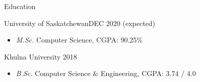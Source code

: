 \documentclass[]{mcdowellcv}
\begin{document}
	\makeheader
	
	
	
	\begin{cvsection}{Education}
		\begin{cvsubsection}{University of Saskatchewan}{}{DEC 2020 (expected)}
			\begin{itemize}
				\item \emph{M.Sc.} Computer Science, CGPA: 90.25\%
				
			\end{itemize}
		\end{cvsubsection}
		\begin{cvsubsection}{Khulna University}{}{ 2018}
			\begin{itemize}
				\item \emph{B.Sc.} Computer Science \& Engineering, CGPA: 3.74 / 4.0
				
			\end{itemize}
		\end{cvsubsection}
	\end{cvsection}
	
\end{document}
